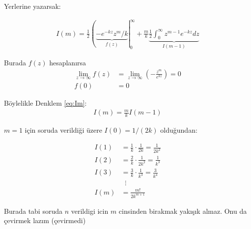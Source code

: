 \documentclass{article}
\begin{document}
Yerlerine yazarsak:

\begin{align}
    \label{eq:Im}
    I(m) = \frac{1}{2}\left(\underbrace{-e^{-kz}z^m/k}_{f(z)}\right|_0^\infty + \frac{m}{k}\underbrace{\frac{1}{2}\int_0^\infty z^{m-1}e^{-kz}dz}_{I(m-1)} 
\end{align}

Burada $f(z)$ hesaplanırsa 
\begin{align}
\lim_{z \to \infty} f(z) &= \lim_{z \to \infty} \left(-\frac{z^m}{e^{kz}}\right) = 0 \\
f(0) &= 0 
\end{align}


Böylelikle Denklem \eqref{eq:Im}: 
\begin{align}
    I(m) = \frac{m}{k} I(m-1) 
\end{align}

$m=1$ için soruda verildiği üzere $I(0) = 1/(2k)$ olduğundan: 

\begin{align}
    I(1) &= \frac{1}{k} \cdot \frac{1}{2k} = \frac{1}{2k^2} \\
    I(2) &= \frac{2}{k} \cdot \frac{1}{2k^2} = \frac{1}{k^3} \\
    I(3) &= \frac{3}{k} \cdot \frac{1}{k^3} = \frac{3}{k^4} \\
      & \;\;\vdots \\
    I(m) &= \frac{m!}{2k^{m+1}} 
\end{align}

Burada tabi soruda $n$ verildigi icin $m$ cinsinden birakmak yakışık almaz. Onu da çevirmek lazım (çevirmedi)
\end{document}

